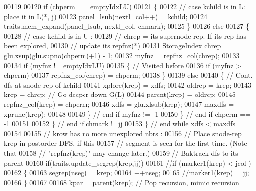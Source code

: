 \begin{DoxyCode}
00119             
00120             \textcolor{keywordflow}{if} (chperm == emptyIdxLU) 
00121             \{
00122               \textcolor{comment}{// case kchild is in L: place it in L(*, j)}
00123               panel\_lsub(nextl\_col++) = kchild;
00124               traits.mem\_expand(panel\_lsub, nextl\_col, chmark);
00125             \}
00126             \textcolor{keywordflow}{else}
00127             \{
00128               \textcolor{comment}{// case kchild is in U :}
00129               \textcolor{comment}{// chrep = its supernode-rep. If its rep has been explored, }
00130               \textcolor{comment}{// update its repfnz(*)}
00131               StorageIndex chrep = glu.xsup(glu.supno(chperm)+1) - 1; 
00132               myfnz = repfnz\_col(chrep); 
00133               
00134               \textcolor{keywordflow}{if} (myfnz != emptyIdxLU) 
00135               \{ \textcolor{comment}{// Visited before }
00136                 \textcolor{keywordflow}{if} (myfnz > chperm) 
00137                   repfnz\_col(chrep) = chperm; 
00138               \}
00139               \textcolor{keywordflow}{else} 
00140               \{ \textcolor{comment}{// Cont. dfs at snode-rep of kchild}
00141                 xplore(krep) = xdfs; 
00142                 oldrep = krep; 
00143                 krep = chrep; \textcolor{comment}{// Go deeper down G(L)}
00144                 parent(krep) = oldrep; 
00145                 repfnz\_col(krep) = chperm; 
00146                 xdfs = glu.xlsub(krep); 
00147                 maxdfs = xprune(krep); 
00148                 
00149               \} \textcolor{comment}{// end if myfnz != -1}
00150             \} \textcolor{comment}{// end if chperm == -1 }
00151                 
00152           \} \textcolor{comment}{// end if chmark !=jj}
00153         \} \textcolor{comment}{// end while xdfs < maxdfs}
00154         
00155         \textcolor{comment}{// krow has no more unexplored nbrs :}
00156         \textcolor{comment}{//    Place snode-rep krep in postorder DFS, if this }
00157         \textcolor{comment}{//    segment is seen for the first time. (Note that }
00158         \textcolor{comment}{//    "repfnz(krep)" may change later.)}
00159         \textcolor{comment}{//    Baktrack dfs to its parent}
00160         \textcolor{keywordflow}{if}(traits.update\_segrep(krep,jj))
00161         \textcolor{comment}{//if (marker1(krep) < jcol )}
00162         \{
00163           segrep(nseg) = krep; 
00164           ++nseg; 
00165           \textcolor{comment}{//marker1(krep) = jj; }
00166         \}
00167         
00168         kpar = parent(krep); \textcolor{comment}{// Pop recursion, mimic recursion }

\end{DoxyCode}
